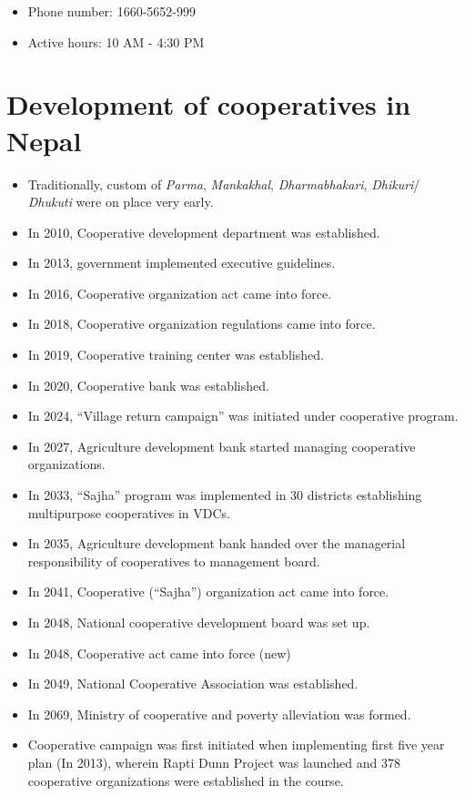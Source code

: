 \documentclass[
]{book}
\providecommand{\tightlist}{%
  \setlength{\itemsep}{0pt}\setlength{\parskip}{0pt}}
\begin{document}
\begin{itemize}
\tightlist
\item
  Phone number: 1660-5652-999
\item
  Active hours: 10 AM - 4:30 PM
\end{itemize}

\hypertarget{development-of-cooperatives-in-nepal}{%
\section{Development of cooperatives in Nepal}\label{development-of-cooperatives-in-nepal}}

\begin{itemize}
\item
  Traditionally, custom of \emph{Parma}, \emph{Mankakhal}, \emph{Dharmabhakari}, \emph{Dhikuri}/ \emph{Dhukuti} were on place very early.
\item
  In 2010, Cooperative development department was established.
\item
  In 2013, government implemented executive guidelines.
\item
  In 2016, Cooperative organization act came into force.
\item
  In 2018, Cooperative organization regulations came into force.
\item
  In 2019, Cooperative training center was established.
\item
  In 2020, Cooperative bank was established.
\item
  In 2024, ``Village return campaign'' was initiated under cooperative program.
\item
  In 2027, Agriculture development bank started managing cooperative organizations.
\item
  In 2033, ``Sajha'' program was implemented in 30 districts establishing multipurpose cooperatives in VDCs.
\item
  In 2035, Agriculture development bank handed over the managerial responsibility of cooperatives to management board.
\item
  In 2041, Cooperative (``Sajha'') organization act came into force.
\item
  In 2048, National cooperative development board was set up.
\item
  In 2048, Cooperative act came into force (new)
\item
  In 2049, National Cooperative Association was established.
\item
  In 2069, Ministry of cooperative and poverty alleviation was formed.
\item
  Cooperative campaign was first initiated when implementing first five year plan (In 2013), wherein Rapti Dunn Project was launched and 378 cooperative organizations were established in the course.
\end{itemize}
\end{document}
